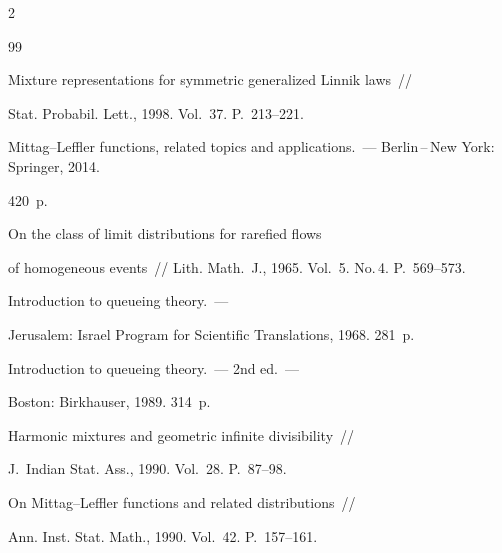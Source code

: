 \begin{multicols}{2}
{{\begin{thebibliography}{99}


 Mixture representations for symmetric generalized Linnik laws~// 


Stat. Probabil. Lett., 1998. Vol.~37. P.~213--221.









Mittag--Leffler functions, related topics and applications.~--- Berlin\,--\,New York: Springer, 2014.


420~p.







 On the class of limit distributions for rarefied flows 


of homogeneous events~// Lith. Math.~J., 1965. Vol.~5. No.\,4. P.~569--573.







 Introduction to queueing theory.~--- 


Jerusalem: Israel Program for Scientific Translations, 1968. 281~p.







 Introduction to queueing theory.~--- 2nd ed.~--- 


Boston: Birkhauser, 1989. 314~p.







 Harmonic mixtures and geometric infinite divisibility~// 


J.~Indian Stat. Ass., 1990. Vol.~28. P.~87--98.







 On Mittag--Leffler functions and related distributions~// 


Ann. Inst. Stat. Math., 1990. Vol.~42. P.~157--161.






\end{thebibliography}}}
\end{multicols}
